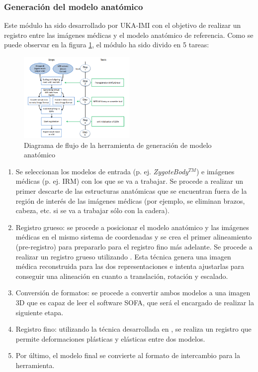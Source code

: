 \subsubsection{Generación del modelo anatómico}
Este módulo ha sido desarrollado por \ac{UKA-IMI} con el objetivo de realizar un registro entre las imágenes médicas y el modelo anatómico de referencia. Como se puede observar en la figura \ref{fig:r32}, el módulo ha sido divido en 5 tareas:
\begin{figure}[h]
    \centering
    \includegraphics[width=0.5\textwidth]{IMG/rasimasd32.PNG}
    \caption{ Diagrama de flujo de la herramienta de generación de modelo anatómico}
    \label{fig:r32}
\end{figure}
\begin{enumerate}
    \item  Se seleccionan los modelos de entrada (p. ej. \emph{ZygoteBody}$^{TM}$) e imágenes médicas (p. ej. \ac{IRM}) con los que se va a trabajar. Se procede a realizar un primer descarte de las estructuras anatómicas que se encuentran fuera de la región de interés de las imágenes médicas (por ejemplo, se eliminan brazos, cabeza, etc. si se va a trabajar sólo con la cadera).
    \item Registro grueso: se procede a posicionar el modelo anatómico y las imágenes médicas en el mismo sistema de coordenadas y se crea el primer alineamiento (pre-registro) para prepararlo para el registro fino más adelante. Se procede a realizar un registro grueso utilizando \cite{antoinemri}. Esta técnica genera una imagen médica reconstruida para las dos representaciones e intenta ajustarlas para conseguir una alineación en cuanto a translación, rotación y escalado.
    \item Conversión de formatos: se procede a convertir ambos modelos a una imagen 3D que es capaz de leer el software \ac{SOFA}, que será el encargado de realizar la siguiente etapa.
    \item Registro fino: utilizando la técnica desarrollada en \cite{gilles2008}, se realiza un registro que permite deformaciones plásticas y elásticas entre dos modelos.
    \item Por último, el modelo final se convierte al formato de intercambio para la herramienta.
\end{enumerate}


